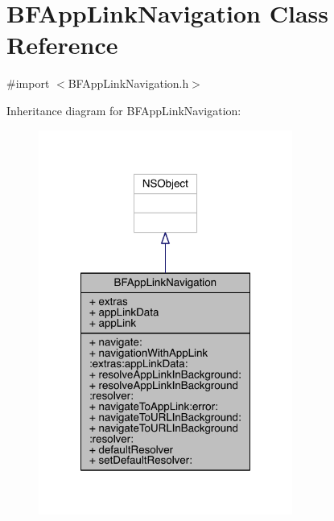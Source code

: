 \hypertarget{interface_b_f_app_link_navigation}{\section{B\-F\-App\-Link\-Navigation Class Reference}
\label{interface_b_f_app_link_navigation}
}


{\ttfamily \#import $<$B\-F\-App\-Link\-Navigation.\-h$>$}



Inheritance diagram for B\-F\-App\-Link\-Navigation\-:
\nopagebreak
\begin{figure}[H]
\begin{center}
\leavevmode
\includegraphics[width=236pt]{interface_b_f_app_link_navigation__inherit__graph}
\end{center}
\end{figure}


